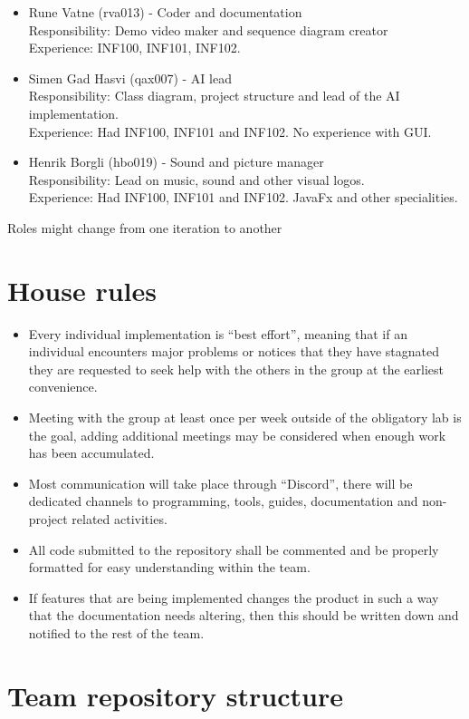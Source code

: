 \documentclass[12pt]{article}%
\begin{document}
\begin{itemize}
\item Rune Vatne  (rva013) - Coder and documentation\\
Responsibility:  Demo video maker and sequence diagram creator \\
	Experience: INF100, INF101, INF102.
\item Simen Gad Hasvi  (qax007) - AI lead\\
Responsibility: Class diagram, project structure and lead of the AI implementation.\\
	Experience: Had INF100, INF101 and INF102. No experience with GUI.
  \item Henrik Borgli (hbo019) - Sound and picture manager\\
  Responsibility: Lead on music, sound and other visual logos.\\
  	Experience: Had INF100, INF101 and INF102. JavaFx and other specialities.
\end{itemize}

Roles might change from one iteration to another


\section{House rules}


\begin{itemize}
\item Every individual implementation is “best effort”, meaning that if an individual encounters major problems or notices that they have stagnated they are requested to seek help with the others in the group at the earliest convenience.
\item Meeting with the group at least once per week outside of the obligatory lab is the goal, adding additional meetings may be considered when enough work has been accumulated.
\item Most communication will take place through “Discord”, there will be dedicated channels to programming, tools, guides, documentation and non-project related activities.
\item All code submitted to the repository shall be commented and be properly formatted for easy understanding within the team.
\item If features that are being implemented changes the product in such a way that the documentation needs altering, then this should be written down and notified to the rest of the team.
\end{itemize}


\section{Team repository structure}
\end{document}
